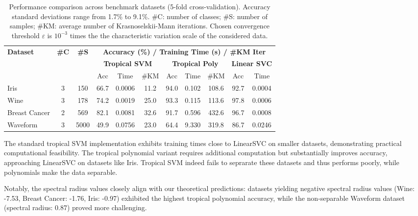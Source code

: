 \documentclass{article}
\begin{document}
\begin{table}[h]
\centering
\footnotesize
\begin{tabular}{@{}l@{\hskip 4pt}c@{\hskip 4pt}c@{\hskip 8pt}cc@{\hskip 4pt}c@{\hskip 8pt}ccc@{\hskip 8pt}cc@{}}
\toprule
\multirow{3}{*}{\textbf{Dataset}} & \multirow{3}{*}{\textbf{\#C}} & \multirow{3}{*}{\textbf{\#S}} & \multicolumn{8}{c}{\textbf{Accuracy (\%) / Training Time (s) / \#KM Iter}} \\
\cmidrule(lr){4-11}
& & & \multicolumn{3}{c}{\textbf{Tropical SVM}} & \multicolumn{3}{c}{\textbf{Tropical Poly}} & \multicolumn{2}{c}{\textbf{Linear SVC}} \\
\cmidrule(lr){4-6} \cmidrule(lr){7-9} \cmidrule(lr){10-11}
& & & Acc & Time & \#KM & Acc & Time & \#KM & Acc & Time \\
\midrule
Iris & 3 & 150 & 66.7 & 0.0006 & 11.2 & 94.0 & 0.102 & 108.6 & 92.7 & 0.0004 \\
Wine & 3 & 178 & 74.2 & 0.0019 & 25.0 & 93.3 & 0.115 & 113.6 & 97.8 & 0.0006 \\
Breast Cancer & 2 & 569 & 82.1 & 0.0081 & 32.6 & 91.7 & 0.596 & 432.6 & 96.7 & 0.0008 \\
Waveform & 3 & 5000 & 49.9 & 0.0756 & 23.0 & 64.4 & 9.330 & 319.8 & 86.7 & 0.0246 \\
\bottomrule
\end{tabular}
\vspace{0.5em}
\caption{Performance comparison across benchmark datasets (5-fold cross-validation). Accuracy standard deviations range from 1.7\% to 9.1\%. \#C: number of classes; \#S: number of samples; \#KM: average number of Krasnoselskii-Mann iterations.
Chosen convergence threshold $\varepsilon$ is $10^{-3}$ times the the characteristic variation scale of the considered data.}
\label{tab:benchmark_results}
\end{table}    

The standard tropical SVM implementation exhibits training times close to LinearSVC on smaller datasets, demonstrating practical computational feasibility. The tropical polynomial variant requires additional computation but substantially improves accuracy, approaching LinearSVC on datasets like Iris.
Tropical SVM indeed fails to seprarate these datasets and thus performs poorly, while polynomials make the data separable.

Notably, the spectral radius values closely align with our theoretical predictions: datasets yielding negative spectral radius values (Wine: -7.53, Breast Cancer: -1.76, Iris: -0.97) exhibited the highest tropical polynomial accuracy, while the non-separable Waveform dataset (spectral radius: 0.87) proved more challenging.
\end{document}
